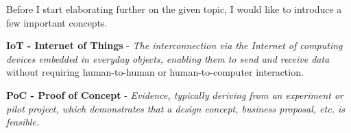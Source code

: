 \linebreak
Before I start elaborating further on the given topic, I would like to introduce a few important concepts.

\textbf{IoT - Internet of Things} - \textit{The interconnection via the Internet of computing devices embedded in everyday objects, enabling them to send and receive data} \cite{IoT-dictionary} without requiring human-to-human or human-to-computer interaction. \cite{IoT-definition-no-interaction}

\textbf{PoC - Proof of Concept} - \textit{Evidence, typically deriving from an experiment or pilot project, which demonstrates that a design concept, business proposal, etc. is feasible.} \cite{PoC-dictionary}
